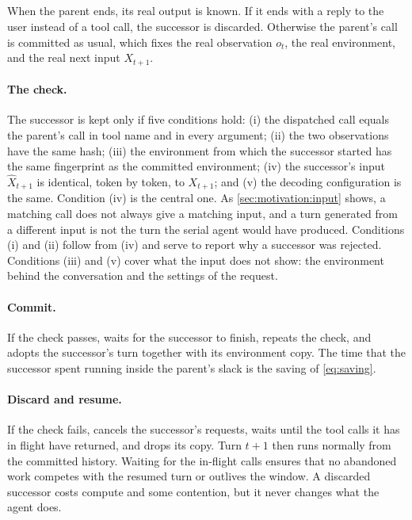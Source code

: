 \subsection{\stratCommit}
\label{sec:method:commit}

When the parent ends, its real output is known.
If it ends with a reply to the user instead of a tool call, the successor is discarded.
Otherwise the parent's call is committed as usual, which fixes the real observation $o_t$, the real environment, and the real next input $X_{t+1}$.

\paragraph{The check.}
The successor is kept only if five conditions hold:
(i) the dispatched call equals the parent's call in tool name and in every argument;
(ii) the two observations have the same hash;
(iii) the environment from which the successor started has the same fingerprint as the committed environment;
(iv) the successor's input $\hat X_{t+1}$ is identical, token by token, to $X_{t+1}$; and
(v) the decoding configuration is the same.
Condition (iv) is the central one.
As \cref{sec:motivation:input} shows, a matching call does not always give a matching input, and a turn generated from a different input is not the turn the serial agent would have produced.
Conditions (i) and (ii) follow from (iv) and serve to report why a successor was rejected.
Conditions (iii) and (v) cover what the input does not show: the environment behind the conversation and the settings of the request.

\paragraph{Commit.}
If the check passes, \method waits for the successor to finish, repeats the check, and adopts the successor's turn together with its environment copy.
The time that the successor spent running inside the parent's slack is the saving of \cref{eq:saving}.

\paragraph{Discard and resume.}
If the check fails, \method cancels the successor's requests, waits until the tool calls it has in flight have returned, and drops its copy.
Turn $t{+}1$ then runs normally from the committed history.
Waiting for the in-flight calls ensures that no abandoned work competes with the resumed turn or outlives the window.
A discarded successor costs compute and some contention, but it never changes what the agent does.

